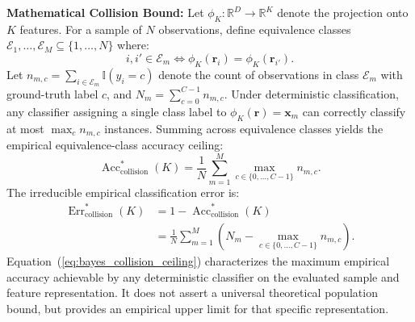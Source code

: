 \documentclass[10pt,journal,twocolumn]{IEEEtran}
\begin{document}
\textbf{Mathematical Collision Bound:} Let $\phi_K: \mathbb{R}^D \to \mathbb{R}^K$ denote the projection onto $K$ features. For a sample of $N$ observations, define equivalence classes $\mathcal{E}_1, \dots, \mathcal{E}_M \subseteq \{1, \dots, N\}$ where:
\begin{equation}
i, i' \in \mathcal{E}_m \iff \phi_K(\mathbf{r}_i) = \phi_K(\mathbf{r}_{i'}).
\end{equation}
Let $n_{m,c} = \sum_{i \in \mathcal{E}_m} \mathbb{I}(y_i = c)$ denote the count of observations in class $\mathcal{E}_m$ with ground-truth label $c$, and $N_m = \sum_{c=0}^{C-1} n_{m,c}$. Under deterministic classification, any classifier assigning a single class label to $\phi_K(\mathbf{r}) = \mathbf{x}_m$ can correctly classify at most $\max_{c} n_{m,c}$ instances. Summing across equivalence classes yields the empirical equivalence-class accuracy ceiling:
\begin{equation}
\operatorname{Acc}_{\text{collision}}^*(K) = \frac{1}{N} \sum_{m=1}^{M} \max_{c \in \{0, \dots, C-1\}} n_{m,c}.
\label{eq:bayes_collision_ceiling}
\end{equation}
The irreducible empirical classification error is:
\begin{equation}
\begin{split}
\operatorname{Err}_{\text{collision}}^*(K) &= 1 - \operatorname{Acc}_{\text{collision}}^*(K) \\
&= \frac{1}{N} \sum_{m=1}^{M} \left( N_m - \max_{c \in \{0, \dots, C-1\}} n_{m,c} \right).
\end{split}
\end{equation}
Equation~(\ref{eq:bayes_collision_ceiling}) characterizes the maximum empirical accuracy achievable by any deterministic classifier on the evaluated sample and feature representation. It does not assert a universal theoretical population bound, but provides an empirical upper limit for that specific representation.
\end{document}
